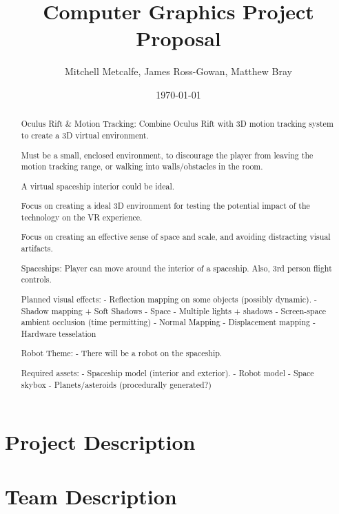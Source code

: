 \documentclass[11pt]{scrartcl} %
\title{Computer Graphics Project Proposal}
\author{Mitchell Metcalfe, James Ross-Gowan, Matthew Bray }
\date{\today} %
\begin{document}
\maketitle

\begin{abstract}

Oculus Rift \& Motion Tracking:
    Combine Oculus Rift with 3D motion tracking system to create a 3D virtual
    environment.

    Must be a small, enclosed environment, to discourage the player from
    leaving the motion tracking range, or walking into walls/obstacles in the
    room.

    A virtual spaceship interior could be ideal.

    Focus on creating a ideal 3D environment for testing the potential impact
    of the technology on the VR experience.

    Focus on creating an effective sense of space and scale, and avoiding
    distracting visual artifacts.

Spaceships: 
    Player can move around the interior of a spaceship.
    Also, 3rd person flight controls.

    Planned visual effects:
        - Reflection mapping on some objects (possibly dynamic).
        - Shadow mapping + Soft Shadows
        - Space
        - Multiple lights + shadows
        - Screen-space ambient occlusion (time permitting)
        - Normal Mapping
        - Displacement mapping
        - Hardware tesselation

    Robot Theme:
        - There will be a robot on the spaceship.

    Required assets:
        - Spaceship model (interior and exterior).
        - Robot model
        - Space skybox
        - Planets/asteroids (procedurally generated?)

\end{abstract}

\section*{Project Description}


\section*{Team Description}
\end{document}
